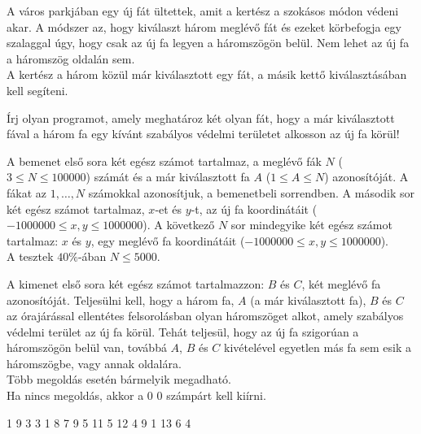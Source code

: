 ﻿





A város parkjában egy új fát ültettek, amit a kertész a szokásos módon védeni akar. A módszer az, hogy kiválaszt három meglévő fát és ezeket körbefogja egy szalaggal úgy, hogy csak az új fa legyen a háromszögön belül. Nem lehet az új fa a háromszög oldalán sem.\\
A kertész a három közül már kiválasztott egy fát, a másik kettő kiválasztásában kell segíteni.

Írj olyan programot, amely meghatároz két olyan fát, hogy a már kiválasztott fával a három fa egy kívánt szabályos védelmi területet alkosson az új fa körül!

A bemenet első sora két egész számot tartalmaz, a meglévő fák $N$ ($3 \leq N \leq 100000$) számát és a már kiválasztott fa $A$ ($1 \leq A \leq N$) azonosítóját. A fákat az $1,\ldots,N$ számokkal azonosítjuk, a bemenetbeli sorrendben. A második sor két egész számot tartalmaz, $x$-et és $y$-t, az új fa koordinátáit ($-1000000 \leq x,y \leq 1000000$). A következő $N$ sor mindegyike két egész számot tartalmaz: $x$ és $y$, egy meglévő fa koordinátáit ($-1000000 \leq x,y \leq 1000000$).\\
\smallskip
\noindent A tesztek $40 \%$-ában $N \leq 5000$.

A kimenet első sora két egész számot tartalmazzon: $B$ és $C$, két meglévő fa azonosítóját. Teljesülni kell, hogy a három fa, $A$ (a már kiválasztott fa), $B$ és $C$ az órajárással ellentétes felsorolásban olyan háromszöget alkot, amely szabályos védelmi terület az új fa körül. Tehát teljesül, hogy az új fa szigorúan a háromszögön belül van, továbbá $A$, $B$ és $C$ kivételével egyetlen más fa sem esik a háromszögbe, vagy annak oldalára.\\
Több megoldás esetén bármelyik megadható.\\
Ha nincs megoldás, akkor a $0\,\, 0$ számpárt kell kiírni.


 1
9 3
3 1
8 7
9 5
11 5
12 4
9 1
13 6
 4
\sampleCOMMENT

\sampleEND
\bigskip


